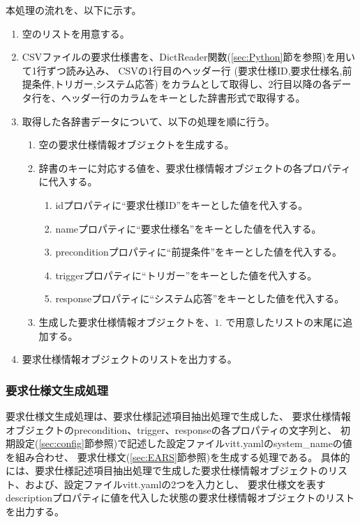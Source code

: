 本処理の流れを、以下に示す。
\begin{enumerate}
    \item 空のリストを用意する。
    \item CSVファイルの要求仕様書を、DictReader関数(\ref{sec:Python}節を参照)を用いて1行ずつ読み込み、
    CSVの1行目のヘッダー行 (要求仕様ID,要求仕様名,前提条件,トリガー,システム応答) をカラムとして取得し、2行目以降の各データ行を、ヘッダー行のカラムをキーとした辞書形式で取得する。
    \item 取得した各辞書データについて、以下の処理を順に行う。
    \begin{enumerate}
        \item 空の要求仕様情報オブジェクトを生成する。
        \item 辞書のキーに対応する値を、要求仕様情報オブジェクトの各プロパティに代入する。
        \begin{enumerate}
            \item idプロパティに``要求仕様ID''をキーとした値を代入する。
            \item nameプロパティに``要求仕様名''をキーとした値を代入する。
            \item preconditionプロパティに``前提条件''をキーとした値を代入する。
            \item triggerプロパティに``トリガー''をキーとした値を代入する。
            \item responseプロパティに``システム応答''をキーとした値を代入する。
        \end{enumerate}
        \item 生成した要求仕様情報オブジェクトを、$1$. で用意したリストの末尾に追加する。
    \end{enumerate}
    \item 要求仕様情報オブジェクトのリストを出力する。
\end{enumerate}

\subsubsection{要求仕様文生成処理}\label{subsubsec:req_text_gen}
要求仕様文生成処理は、要求仕様記述項目抽出処理で生成した、
要求仕様情報オブジェクトのprecondition、trigger、responseの各プロパティの文字列と、
初期設定(\ref{sec:config}節参照)で記述した設定ファイルvitt.yamlのsystem\_nameの値を組み合わせ、
要求仕様文(\ref{sec:EARS}節参照)を生成する処理である。
具体的には、要求仕様記述項目抽出処理で生成した要求仕様情報オブジェクトのリスト、および、設定ファイルvitt.yamlの2つを入力とし、
要求仕様文を表すdescriptionプロパティに値を代入した状態の要求仕様情報オブジェクトのリストを出力する。

